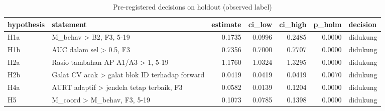 \begin{table}
\caption{Pre-registered decisions on holdout (observed label)}
\label{tab:tab_holdout_summary}
\begin{tabular}{llrrrrl}
\toprule
hypothesis & statement & estimate & ci\_low & ci\_high & p\_holm & decision \\
\midrule
H1a & M\_behav > B2, F3, 5-19 & 0.1735 & 0.0996 & 0.2485 & 0.0000 & didukung \\
H1b & AUC dalam sel > 0.5, F3 & 0.7356 & 0.7000 & 0.7707 & 0.0000 & didukung \\
H2a & Rasio tambahan AP A1/A3 > 1, 5-19 & 1.1760 & 1.0324 & 1.3295 & 0.0000 & didukung \\
H2b & Galat CV acak > galat blok ID terhadap forward & 0.0419 & 0.0419 & 0.0419 & 0.0070 & didukung \\
H4a & AURT adaptif > jendela tetap terbaik, F3 & 0.0582 & 0.0139 & 0.1204 & 0.0000 & didukung \\
H5 & M\_coord > M\_behav, F3, 5-19 & 0.1073 & 0.0785 & 0.1398 & 0.0000 & didukung \\
\bottomrule
\end{tabular}
\end{table}

